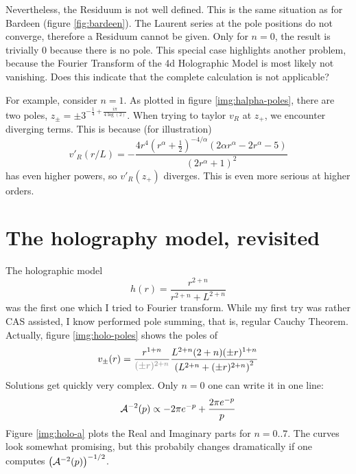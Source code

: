 \documentclass[10pt,a4paper, fleqn]{article}
\begin{document}
Nevertheless, the Residuum is not well defined. This is the same situation as for Bardeen (figure \ref{fig:bardeen}). The Laurent series at the pole positions do not converge, therefore a Residuum cannot be given. Only for $n=0$, the result is trivially 0 because there is no pole. This special case highlights another problem, because the Fourier Transform of the 4d Holographic Model is most likely not vanishing. Does this indicate that the complete calculation is not applicable?

For example, consider $n=1$. As plotted in figure \ref{img:halpha-poles}, there are two poles, $z_\pm = \pm 3^{-\frac{1}{4}+\frac{i \pi }{4 \log (2)}}$. When trying to taylor $v_R$ at $z_+$, we encounter diverging terms. This is because (for illustration)
%
\begin{equation}
v'_R(r/L)  = -\frac{4 r^4 \left(r^{\alpha }+\frac{1}{2}\right)^{-4/\alpha } \left(2 \alpha  r^{\alpha }-2 r^{\alpha
   }-5\right)}{\left(2 r^{\alpha }+1\right)^2}
\end{equation}
%
has even higher powers, so $v'_R(z_+)$ diverges. This is even more serious at higher orders.

\clearpage
\section{The holography model, revisited}
The holographic model
%
\begin{equation}
h(r) = \frac{r^{2+n}}{r^{2+n} + L^{2+n}}
\end{equation}
%
was the first one which I tried to Fourier transform. While my first try was rather CAS assisted, I know performed pole summing, that is, regular Cauchy Theorem. Actually, figure \ref{img:holo-poles} shows the poles of
%
\begin{equation}
v_\pm(r) = \frac{r^{1+n}}{\mathcolor{gray}{(\pm r)^{2+n}}}
\frac{L^{2+n} (2+n) (\pm r)^{1+n}}
{ \left(L^{2+n} + (\pm r)^{2+n} \right)^2 }
\end{equation}
%
Solutions get quickly very complex. Only $n=0$ one can write it in one line:
%
\begin{equation}
{\cal A}^{-2}(p) \propto -2\pi e^{-p} + \frac{ 2\pi e^{-p}}p
\end{equation}
%
Figure \ref{img:holo-a} plots the Real and Imaginary parts for $n=0..7$. The curves look somewhat promising, but this probabily changes dramatically if one computes $\left( {\cal A}^{-2}(p) \right)^{-1/2}$.

\end{document}
